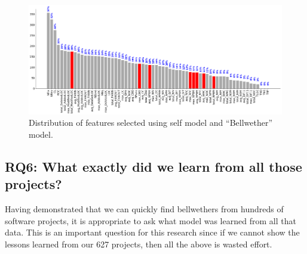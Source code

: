 \documentclass[10pt,journal,compsoc]{IEEEtran}
\begin{document}
\begin{figure}[h]
    \centering
    \includegraphics[width=\linewidth]{figs/FSS_compare.png}
    \caption{Distribution of features selected using self model and ``Bellwether'' model.}
    \label{fig:FSS_compare}
\end{figure}

\subsection*{RQ6: What exactly did we learn from all those projects?}
\label{sec:rq6}

Having demonstrated that we can quickly find bellwethers
from hundreds of software projects, it is appropriate to ask
what model was learned from all that data. This is an important question for this research since if  we cannot show the lessons
learned from our 627 projects, then all the above is wasted effort.
\end{document}

